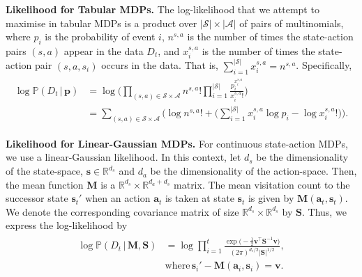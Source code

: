 \noindent\textbf{Likelihood for Tabular MDPs.}
The log-likelihood that we attempt to maximise in tabular MDPs is a product over $|\mathcal{S}|\times|\mathcal{A}|$ of pairs of multinomials, where $p_i$ is the probability of event $i$, $n^{s,a}$ is the number of times the state-action pairs $(s, a)$ appear in the data $D_t$, and $x_i^{s,a}$ is the number of times the state-action pair $(s, a, s_i)$ occurs in the data. That is, $\sum_{i=1}^{|\mathcal{S}|} x_i^{s,a} = n^{s,a}$. Specifically,
\begin{align*}
\begin{aligned}
    \log \mathbb{P}(D_t \, | \, \bm{p}) &= \log \Bigg(\prod_{(s, a) \in \mathcal{S}\times\mathcal{A}} n^{s,a}!\prod_{i=1}^{|\mathcal{S}|}\frac{p_i^{x^{s,a}_i}}{x^{s,a}_i!} \Bigg)\\
    &= \sum_{(s,a)\in\mathcal{S}\times\mathcal{A}} \Bigg(\log n^{s, a}!+\Big(\sum_{i=1}^{|\mathcal{S}|}x_i^{s,a}\log p_i - \log x_i^{s,a}!\Big)\Bigg).
\end{aligned}
\end{align*}

\noindent\textbf{Likelihood for Linear-Gaussian MDPs.}
For continuous state-action MDPs, we use a linear-Gaussian likelihood. In this context, let $d_s$ be the dimensionality of the state-space, $\bm{s} \in \mathbb{R}^{d_s}$ and $d_a$ be the dimensionality of the action-space. Then, the mean function $\mathbf{M}$ is a $\mathbb{R}^{d_s}\times\mathbb{R}^{d_a+d_s}$ matrix. The mean visitation count to the successor state $\bm{s}_t'$ when an action $\bm{a}_t$ is taken at state $\bm{s}_t$ is given by $\mathbf{M}(\bm{a}_t, \bm{s}_t)$. We denote the corresponding covariance matrix of size $\mathbb{R}^{d_s}\times\mathbb{R}^{d_s}$ by $\mathbf{S}$. Thus, we express the log-likelihood by
\begin{align*}
\begin{aligned}
    \log \mathbb{P}(D_t \, | \, \mathbf{M}, \mathbf{S}) &= \log \prod_{i=1}^t \frac{\exp\Big(-\frac{1}{2}\bm{v}^\top\mathbf{S}^{-1}\bm{v}\Big)}{(2\pi)^{d_s/2}|\mathbf{S}|^{1/2}},\\
    &\textrm{where} \, \bm{s}_i'-\mathbf{M}(\bm{a}_i, \bm{s}_i) = \bm{v}.
\end{aligned}
\end{align*}

